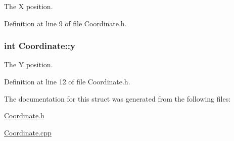 The X position. 



Definition at line 9 of file Coordinate.\-h.

\hypertarget{structCoordinate_a5c7d59f0f65ff9371b6c3791f78880aa}{
\subsubsection[{y}]{\setlength{\rightskip}{0pt plus 5cm}int Coordinate\-::y}}\label{structCoordinate_a5c7d59f0f65ff9371b6c3791f78880aa}


The Y position. 



Definition at line 12 of file Coordinate.\-h.



The documentation for this struct was generated from the following files\-:\begin{DoxyCompactItemize}
\item 
\hyperlink{Coordinate_8h}{Coordinate.\-h}\item 
\hyperlink{Coordinate_8cpp}{Coordinate.\-cpp}\end{DoxyCompactItemize}
